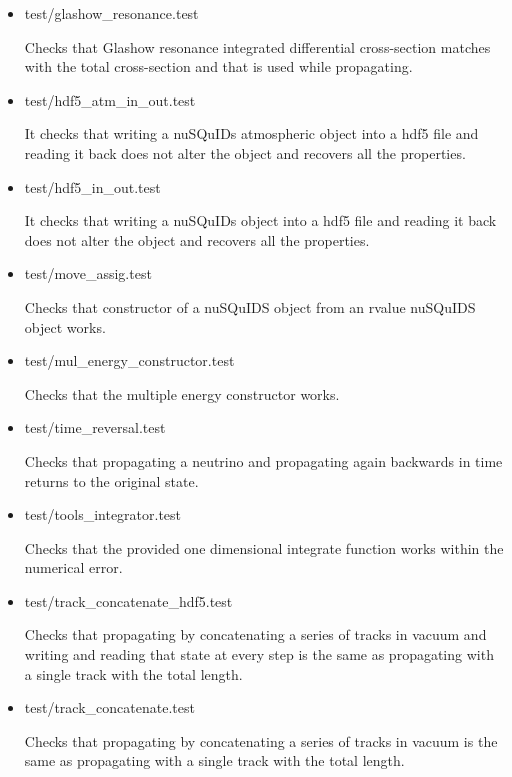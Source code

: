 \documentclass[3p,12pt]{elsarticle}
\newcommand{\ttf}{\ttfamily}
\begin{document}
\begin{itemize}
\item {\ttf test/glashow\_resonance.test}
  
  Checks that Glashow resonance integrated differential cross-section
  matches with the total cross-section and that is used while propagating. 
  
\item {\ttf test/hdf5\_atm\_in\_out.test}
  
  It checks that writing a nuSQuIDs atmospheric object into a hdf5 file and reading it
  back does not alter the object and recovers all the properties.

  
\item {\ttf test/hdf5\_in\_out.test}
  
  It checks that writing a nuSQuIDs object into a hdf5 file and reading it
  back does not alter the object and recovers all the properties.

\item {\ttf test/move\_assig.test}
  
  Checks that constructor of a nuSQuIDS object from an rvalue nuSQuIDS object works.
  
\item {\ttf test/mul\_energy\_constructor.test}
  
  Checks that the multiple energy constructor works.
  
\item {\ttf test/time\_reversal.test}
  
  Checks that propagating a neutrino and propagating again backwards
  in time returns to the original state.
  
\item {\ttf test/tools\_integrator.test}
  
  Checks that the provided one dimensional integrate function works
  within the numerical error.
  
\item {\ttf test/track\_concatenate\_hdf5.test}
  
  Checks that propagating by concatenating a series of tracks in
  vacuum and writing and reading that state at every step is the same
  as propagating with a single track with the total length. 
  
  
\item {\ttf test/track\_concatenate.test}
  
  Checks that propagating by concatenating a series of tracks in
  vacuum is the same as propagating with a single track with the total length. 
  

\end{itemize}
\end{document}
